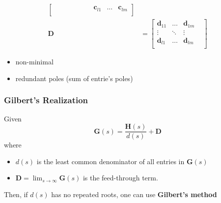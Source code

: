 \begin{align*}
\begin{bmatrix}
                       &                 &                 &       &                 &       &        & \mathbf{c}_{l1} & \dots & \mathbf{c}_{lm} \\
                  \end{bmatrix} \\
    \mathbf{D} & = \begin{bmatrix}
                       \mathbf{d}_{11} & \dots  & \mathbf{d}_{1m}   \\
                       \vdots          & \ddots & \vdots          & \\
                       \mathbf{d}_{l1} & \dots  & \mathbf{d}_{lm} & \\
                   \end{bmatrix}
\end{align*}


\begin{itemize}
    \item non-minimal
    \item redundant poles (sum of entrie's poles)
\end{itemize}

\subsubsection{Gilbert's Realization}

Given
\begin{equation*}
    \mathbf{G}(s)=\frac{\mathbf{H}(s)}{d(s)}+\mathbf{D}
\end{equation*}
where
\begin{itemize}
    \item $d(s)$ is the least common denominator of all entries in $\mathbf{G}(s)$
    \item $\mathbf{D}=\lim_{s\to\infty}\mathbf{G}(s)$ is the feed-through term.
\end{itemize}

Then, if $d(s)$ has no repeated roots, one can use \textbf{Gilbert's method}

